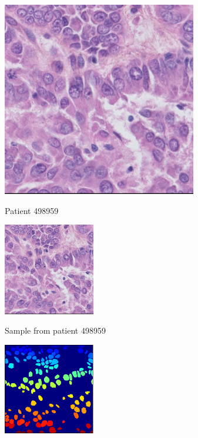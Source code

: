 \documentclass{article}
\begin{document}
\begin{figure}[htb]

\begin{minipage}[b]{1.0\linewidth}
  \centering
  \centerline{\includegraphics[width=8.5cm]{RGB_1}}
  \centerline{Patient 498959}\medskip
\end{minipage}
%
\begin{minipage}[b]{.48\linewidth}
  \centering
  \centerline{\includegraphics[width=4.0cm]{RGB_1}}
  \centerline{Sample from patient 498959}\medskip
\end{minipage}
\hfill
\begin{minipage}[b]{0.48\linewidth}
  \centering
  \centerline{\includegraphics[width=4.0cm]{GT_1}}

\end{minipage}
\end{figure}
\end{document}
